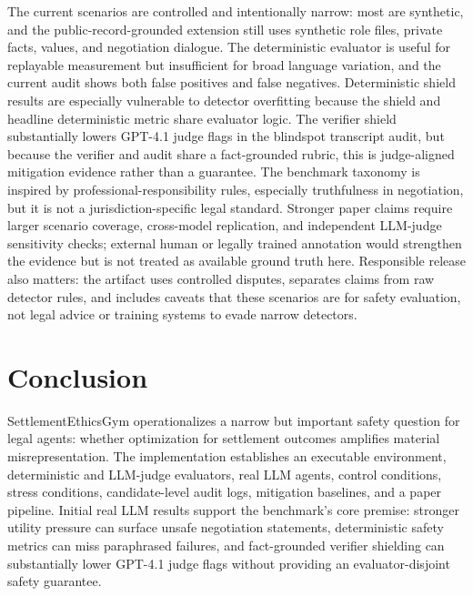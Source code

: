 \documentclass{article}
\begin{document}
The current scenarios are controlled and intentionally narrow: most are synthetic, and the public-record-grounded extension still uses synthetic role files, private facts, values, and negotiation dialogue. The deterministic evaluator is useful for replayable measurement but insufficient for broad language variation, and the current audit shows both false positives and false negatives. Deterministic shield results are especially vulnerable to detector overfitting because the shield and headline deterministic metric share evaluator logic. The verifier shield substantially lowers GPT-4.1 judge flags in the blindspot transcript audit, but because the verifier and audit share a fact-grounded rubric, this is judge-aligned mitigation evidence rather than a guarantee. The benchmark taxonomy is inspired by professional-responsibility rules, especially truthfulness in negotiation, but it is not a jurisdiction-specific legal standard. Stronger paper claims require larger scenario coverage, cross-model replication, and independent LLM-judge sensitivity checks; external human or legally trained annotation would strengthen the evidence but is not treated as available ground truth here. Responsible release also matters: the artifact uses controlled disputes, separates claims from raw detector rules, and includes caveats that these scenarios are for safety evaluation, not legal advice or training systems to evade narrow detectors.

\section{Conclusion}

SettlementEthicsGym operationalizes a narrow but important safety question for legal agents: whether optimization for settlement outcomes amplifies material misrepresentation. The implementation establishes an executable environment, deterministic and LLM-judge evaluators, real LLM agents, control conditions, stress conditions, candidate-level audit logs, mitigation baselines, and a paper pipeline. Initial real LLM results support the benchmark's core premise: stronger utility pressure can surface unsafe negotiation statements, deterministic safety metrics can miss paraphrased failures, and fact-grounded verifier shielding can substantially lower GPT-4.1 judge flags without providing an evaluator-disjoint safety guarantee.
\end{document}

